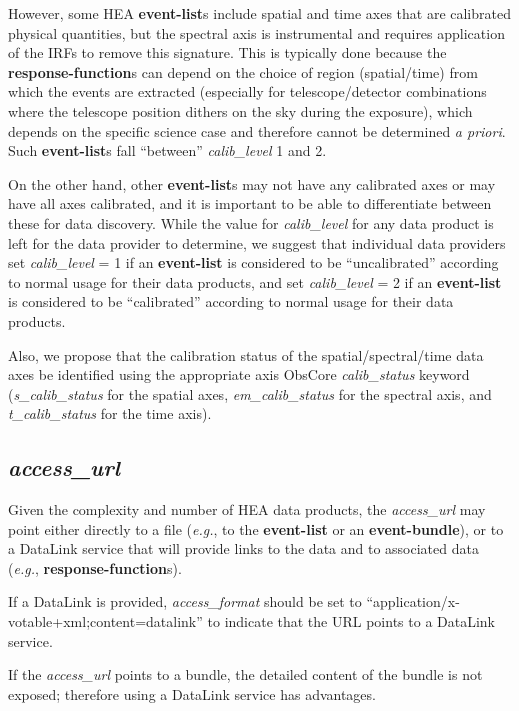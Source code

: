\documentclass[11pt,a4paper]{ivoa}
\begin{document}
However, some \gls{HEA} {\bf event-list}s include spatial and time axes that are calibrated physical quantities, but the spectral axis is instrumental and requires application of the IRFs to remove this signature. This is typically done because the {\bf response-function}s can depend on the choice of region (spatial/time) from which the events are extracted (especially for telescope/detector combinations where the telescope position dithers on the sky during the exposure), which depends on the specific science case and therefore cannot be determined {\em a priori\/}.  Such {\bf event-list}s fall ``between'' {\em calib\_level\/} 1 and 2.

On the other hand, other {\bf event-list}s may not have any calibrated axes or may have all axes calibrated, and it is important to be able to differentiate between these for data discovery.  While the value for {\em calib\_level\/} for any data product is left for the data provider to determine, we suggest that individual data providers set {\em calib\_level\/} = 1 if an {\bf event-list} is considered to be ``uncalibrated'' according to normal usage for their data products, and set {\em calib\_level\/} = 2 if an {\bf event-list} is considered to be ``calibrated'' according to normal usage for their data products.

Also, we propose that the calibration status of the spatial/spectral/time data axes be identified using the appropriate axis ObsCore {\em calib\_status\/} keyword ({\em s\_calib\_status\/} for the spatial axes, {\em em\_calib\_status\/} for the spectral axis, and {\em t\_calib\_status\/} for the time axis).

\subsection{{\em access\_url}}

Given the complexity and number of \gls{HEA} data products, the {\em access\_url\/} may point either directly to a file ({\em e.g.\/}, to the {\bf event-list} or an {\bf event-bundle}), or to a DataLink service that will provide links to the data and to associated data ({\em e.g.\/}, {\bf response-function}s).

If a DataLink is provided, {\em access\_format\/} should be set to ``application/x-votable+xml;content=datalink'' to indicate that the URL points to a Data\-Link service.

If the {\em access\_url\/} points to a bundle, the detailed content of the bundle is not exposed; therefore using a DataLink service has advantages.
\end{document}
